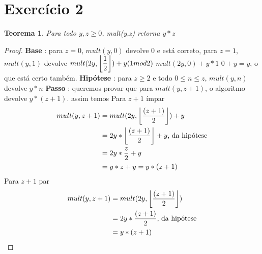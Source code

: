 \documentclass{article}
\DeclarePairedDelimiter\floor{\lfloor}{\rfloor}
\begin{document}
\section{Exercício 2}
\newtheorem{teo2}{Teorema}
\begin{teo2}
	Para todo $y,z \geq 0$, mult(y,z) retorna $y*z$
\end{teo2}
\begin{proof}
	\hfill \break
	\textbf{Base} : para $z = 0$, $mult(y, 0)$ devolve 0 e está correto,\newline
	\hspace*{30pt} para $z = 1$, $mult(y, 1)$ devolve\newline
	\hspace*{30pt} $mult(2y, \floor*{\dfrac{1}{2}}) + y(1 mod 2)$ \newline
	\hspace*{30pt} $mult(2y, 0) + y*1$\newline
	\hspace*{30pt} $ 0 + y = y$, o que está certo também.
	\newline
	\textbf{Hipótese} : para $z \geq 2$ e todo $0 \leq n \leq z$, $mult(y,n)$ devolve $y * n$\newline
	\textbf{Passo} : queremos provar que para $mult(y,z+1)$, o algoritmo devolve $y*(z+1)$.\newline
	\hspace*{30pt} assim temos \newline
	\hspace*{30pt} Para $z+1$ ímpar \newline
	\begin{equation}
		\begin{split}
		mult(y,z+1) & = mult(2y, \floor*{\dfrac{(z+1)}{2}}) + y\\
		& = 2y*\floor*{\dfrac{(z+1)}{2}} + y\text{, da hipótese}\\
		& = 2y*\dfrac{z}{2} + y\\
		& = y*z + y = y*(z+1)
		\end{split}	
	\end{equation}	
	\hspace*{30pt} Para $z+1$ par
	\begin{equation}
		\begin{split}
		mult(y,z+1) & = mult(2y, \floor*{\dfrac{(z+1)}{2}})\\
		& = 2y*\dfrac{(z+1)}{2}\text{, da hipótese}\\
		& = y*(z+1)
		\end{split}	
	\end{equation}	
\end{proof}
\end{document}
